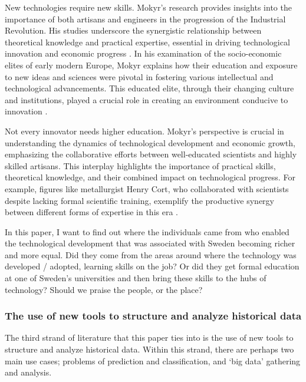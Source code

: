 \documentclass[
]{article}
\begin{document}
New technologies require new skills. Mokyr's research provides insights
into the importance of both artisans and engineers in the progression of
the Industrial Revolution. His studies underscore the synergistic
relationship between theoretical knowledge and practical expertise,
essential in driving technological innovation and economic progress
\autocite{Mokyr2017}. In his examination of the socio-economic elites of
early modern Europe, Mokyr explains how their education and exposure to
new ideas and sciences were pivotal in fostering various intellectual
and technological advancements. This educated elite, through their
changing culture and institutions, played a crucial role in creating an
environment conducive to innovation \autocite{Mokyr2017Journal}.

Not every innovator needs higher education. Mokyr's perspective is
crucial in understanding the dynamics of technological development and
economic growth, emphasizing the collaborative efforts between
well-educated scientists and highly skilled artisans. This interplay
highlights the importance of practical skills, theoretical knowledge,
and their combined impact on technological progress. For example,
figures like metallurgist Henry Cort, who collaborated with scientists
despite lacking formal scientific training, exemplify the productive
synergy between different forms of expertise in this era
\autocite{Mokyr2017Journal}.

In this paper, I want to find out where the individuals came from who
enabled the technological development that was associated with Sweden
becoming richer and more equal. Did they come from the areas around
where the technology was developed / adopted, learning skills on the
job? Or did they get formal education at one of Sweden's universities
and then bring these skills to the hubs of technology? Should we praise
the people, or the place?

\hypertarget{the-use-of-new-tools-to-structure-and-analyze-historical-data}{%
\subsubsection{The use of new tools to structure and analyze historical
data}\label{the-use-of-new-tools-to-structure-and-analyze-historical-data}}

The third strand of literature that this paper ties into is the use of
new tools to structure and analyze historical data. Within this strand,
there are perhaps two main use cases; problems of prediction and
classification, and `big data' gathering and analysis.
\end{document}
